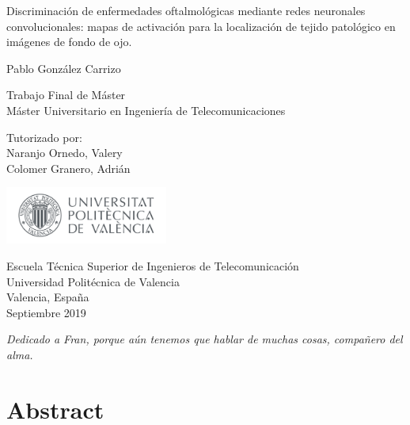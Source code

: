 \documentclass[
  12pt,
  spanish,
  a4paperpaper,
]{report}
\date{}
\begin{document}
\begin{titlepage}
    \begin{center}
        \vspace*{0cm}
        \huge
        Discriminación de enfermedades oftalmológicas mediante redes neuronales convolucionales: mapas de activación para la localización de tejido patológico en imágenes de fondo de ojo.

        \vspace{0.8cm}

        \Large
        Pablo González Carrizo

        \vspace{0.9cm}

        \normalsize
         Trabajo Final de Máster \\
         Máster Universitario en Ingeniería de Telecomunicaciones

        \vfill
        \vspace{0.4cm}

        \normalsize
        Tutorizado por:\\
        Naranjo Ornedo, Valery\\
        Colomer Granero, Adrián

        \vspace{1.1cm}

        \includegraphics[width=0.4\textwidth]{style/UPV.png}

        \normalsize
        Escuela Técnica Superior de Ingenieros de Telecomunicación\\
        Universidad Politécnica de Valencia\\
        Valencia, España \\
        Septiembre 2019
    \end{center}
\end{titlepage}

\vspace*{\fill}

\noindent \textit{
Dedicado a Fran, porque aún tenemos que hablar de muchas cosas, compañero del alma.
} \vspace*{\fill} 

\hypertarget{abstract}{%
\chapter*{Abstract}\label{abstract}}
\end{document}
